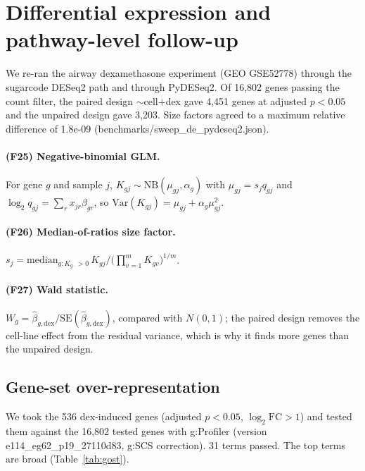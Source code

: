 \section{Differential expression and pathway-level follow-up}
We re-ran the airway dexamethasone experiment (GEO GSE52778) through the sugarcode DESeq2 path and through PyDESeq2. Of 16,802 genes passing the count filter, the paired design $\sim$cell$+$dex gave 4,451 genes at adjusted $p<0.05$ and the unpaired design gave 3,203. Size factors agreed to a maximum relative difference of 1.8e-09 (benchmarks/sweep\_de\_pydeseq2.json).
\paragraph{(F25) Negative-binomial GLM.} For gene $g$ and sample $j$, $K_{gj}\sim\mathrm{NB}(\mu_{gj},\alpha_g)$ with $\mu_{gj}=s_j q_{gj}$ and $\log_2 q_{gj}=\sum_r x_{jr}\beta_{gr}$, so $\mathrm{Var}(K_{gj})=\mu_{gj}+\alpha_g\mu_{gj}^2$.
\paragraph{(F26) Median-of-ratios size factor.} $s_j=\mathrm{median}_{g:K_{g\cdot}>0}\, K_{gj}\big/\big(\prod_{v=1}^{m}K_{gv}\big)^{1/m}$.
\paragraph{(F27) Wald statistic.} $W_g=\hat\beta_{g,\mathrm{dex}}/\mathrm{SE}(\hat\beta_{g,\mathrm{dex}})$, compared with $N(0,1)$; the paired design removes the cell-line effect from the residual variance, which is why it finds more genes than the unpaired design.
\subsection{Gene-set over-representation}
We took the 536 dex-induced genes (adjusted $p<0.05$, $\log_2\mathrm{FC}>1$) and tested them against the 16,802 tested genes with g:Profiler (version e114\_eg62\_p19\_27110d83, g:SCS correction). 31 terms passed. The top terms are broad (Table~\ref{tab:gost}).
